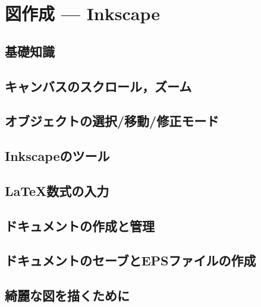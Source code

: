 \documentclass[main]{subfiles}
\begin{document}
\chapter{図作成 --- Inkscape}
\section{基礎知識}
\section{キャンバスのスクロール，ズーム}
\section{オブジェクトの選択/移動/修正モード}
\section{Inkscapeのツール}
\section{\LaTeX 数式の入力}
\section{ドキュメントの作成と管理}
\section{ドキュメントのセーブとEPSファイルの作成}
\section{綺麗な図を描くために}
\fontsize{10.2}{10} \selectfont
\end{document}

